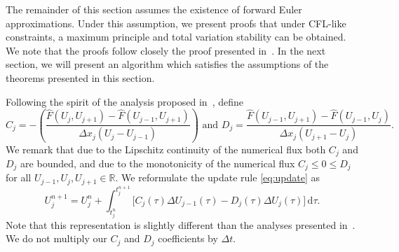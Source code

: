 The remainder of this section assumes the existence of forward Euler approximations. Under this assumption, we present proofs that under CFL-like constraints, a maximum principle and total variation stability can be obtained. We note that the proofs follow closely the proof presented in~\cite{Osher1983,Kirby2003}. In the next section, we will present an algorithm which satisfies the assumptions of the theorems presented in this section.

Following the spirit of the analysis proposed in~\cite{Harten1983}, define
\begin{equation*}
C_j = - \left( \frac{ \hat{F}(U_j,U_{j+1}) - \hat{F}(U_{j-1},U_{j+1})}{\Delta x_j( U_j - U_{j-1})}\right) \text{ and } D_j = \frac{  \hat{F}(U_{j-1},U_{j+1}) - \hat{F}(U_{j-1},U_{j})}{\Delta x_j (U_{j+1} - U_{j})}.
\end{equation*}
We remark that due to the Lipschitz continuity of the numerical flux both $C_j$ and $D_j$ are bounded, and due to the monotonicity of the numerical flux $C_j \le 0 \le D_j$ for all $U_{j-1},U_j,U_{j+1}\in \mathbb{R}$. We reformulate the update rule \eqref{eq:update} as
\begin{equation}
U_j^{n+1} = U_j^n + \int_{t_j^n}^{t^{n+1}_j} \big[ C_j(\tau) \Delta U_{j-1}(\tau) - D_j(\tau) \Delta U_j(\tau) \big] \,\mathrm{d} \tau.
\label{eq:update2}
\end{equation}
Note that this representation is slightly different than the analyses presented in~\cite{Harten1983,Osher1983,Kirby2003}. We do not multiply our $C_j$ and $D_j$ coefficients by $\Delta t$.


